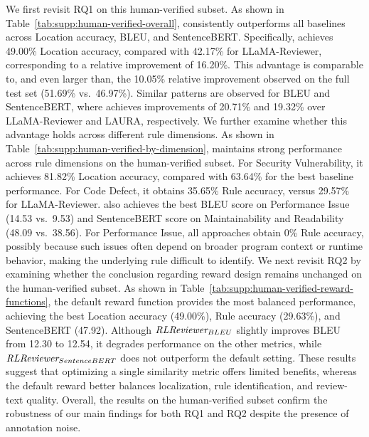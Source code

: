 We first revisit RQ1 on this human-verified subset.
As shown in Table~\ref{tab:supp:human-verified-overall}, \TECH{} consistently outperforms all baselines across Location accuracy, BLEU, and SentenceBERT\@.
Specifically, \TECH{} achieves 49.00\% Location accuracy, compared with 42.17\% for LLaMA-Reviewer, corresponding to a relative improvement of 16.20\%.
This advantage is comparable to, and even larger than, the 10.05\% relative improvement observed on the full test set (51.69\% vs.~46.97\%).
Similar patterns are observed for BLEU and SentenceBERT, where \TECH{} achieves improvements of 20.71\% and 19.32\% over LLaMA-Reviewer and LAURA, respectively.
We further examine whether this advantage holds across different rule dimensions.
As shown in Table~\ref{tab:supp:human-verified-by-dimension}, \TECH{} maintains strong performance across rule dimensions on the human-verified subset.
For Security Vulnerability, it achieves 81.82\% Location accuracy, compared with 63.64\% for the best baseline performance.
For Code Defect, it obtains 35.65\% Rule accuracy, versus 29.57\% for LLaMA-Reviewer.
\TECH{} also achieves the best BLEU score on Performance Issue (14.53 vs.~9.53) and SentenceBERT score on Maintainability and Readability (48.09 vs.~38.56).
For Performance Issue, all approaches obtain 0\% Rule accuracy, possibly because such issues often depend on broader program context or runtime behavior, making the underlying rule difficult to identify.
We next revisit RQ2 by examining whether the conclusion regarding reward design remains unchanged on the human-verified subset.
As shown in Table~\ref{tab:supp:human-verified-reward-functions}, the default reward function provides the most balanced performance, achieving the best Location accuracy (49.00\%), Rule accuracy (29.63\%), and SentenceBERT (47.92). Although $\textit{RLReviewer}{}_{BLEU}$ slightly improves BLEU from 12.30 to 12.54, it degrades performance on the other metrics, while $\textit{RLReviewer}{}_{SentenceBERT}$ does not outperform the default setting.
These results suggest that optimizing a single similarity metric offers limited benefits, whereas the default reward better balances localization, rule identification, and review-text quality.
Overall, the results on the human-verified subset confirm the robustness of our main findings for both RQ1 and RQ2 despite the presence of annotation noise.
